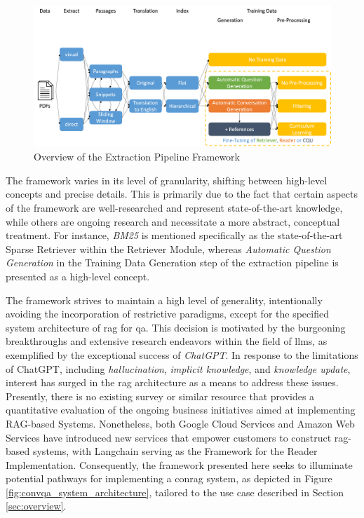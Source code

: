 \begin{figure}
    \centering
    \includegraphics[width=\textwidth]{Grafiken/extract_pipeline.png}
    \caption{Overview of the Extraction Pipeline Framework}
    \label{fig:extract_pipeline}
\end{figure}

The framework varies in its level of granularity, shifting between high-level concepts and precise details. This is primarily due to the fact that certain aspects of the framework are well-researched and represent state-of-the-art knowledge, while others are ongoing research and necessitate a more abstract, conceptual treatment. For instance, \textit{BM25} is mentioned specifically as the state-of-the-art Sparse Retriever within the Retriever Module, whereas \textit{Automatic Question Generation} in the Training Data Generation step of the extraction pipeline is presented as a high-level concept.

The framework strives to maintain a high level of generality, intentionally avoiding the incorporation of restrictive paradigms, except for the specified system architecture of \gls{rag} for \gls{qa}. This decision is motivated by the burgeoning breakthroughs and extensive research endeavors within the field of \gls{llm}s, as exemplified by the exceptional success of \textit{ChatGPT}. In response to the limitations of ChatGPT, including \textit{hallucination}, \textit{implicit knowledge}, and \textit{knowledge update}, interest has surged in the \gls{rag} architecture as a means to address these issues. Presently, there is no existing survey or similar resource that provides a quantitative evaluation of the ongoing business initiatives aimed at implementing RAG-based Systems. Nonetheless, both Google Cloud Services \cite{noauthor_generative_nodate} and Amazon Web Services \cite{noauthor_quickly_2023} have introduced new services that empower customers to construct \gls{rag}-based systems, with Langchain serving as the Framework for the Reader Implementation\cite{noauthor_langchain-ailangchain_nodate}. Consequently, the framework presented here seeks to illuminate potential pathways for implementing a \gls{conrag} system, as depicted in Figure \ref{fig:convqa_system_architecture}, tailored to the use case described in Section \ref{sec:overview}.


